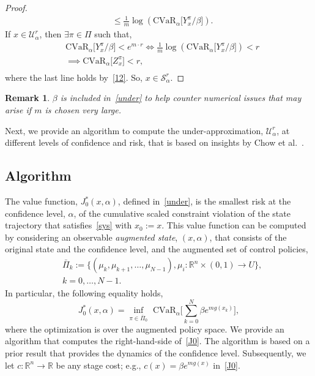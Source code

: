 \documentclass[letterpaper, 10 pt, conference]{ieeeconf}  %
\newtheorem{remark}{Remark}
\begin{document}
\begin{proof}
\begin{equation}
\begin{aligned}
& \leq \frac{1}{m} \log \left(\text{CVaR}_\alpha\big[ Y_x^\pi/\beta \big] \right).
\end{aligned}\label{12}\end{equation}
If $x \in \mathcal{U}_\alpha^r$, then $\exists \pi \in \Pi$ such that,\footnotemark
\begin{equation*}\begin{aligned}
& \text{CVaR}_\alpha \big[ Y_x^\pi /\beta \big] < e^{m\cdot r} \iff \frac{1}{m}\log \left( \text{CVaR}_\alpha \big[  Y_x^\pi /\beta \big] \right) < r \\
& \implies \text{CVaR}_\alpha\big[ Z_x^\pi \big] < r, \\
\end{aligned}\end{equation*}
where the last line holds by~\eqref{12}. So, $x \in \mathcal{S}_\alpha^r$.
\end{proof}
\begin{remark}
$\beta$ is included in~\eqref{under} to help counter numerical issues that may arise if $m$ is chosen very large.
\end{remark}

Next, we provide an algorithm to compute the under-approximation, $\mathcal{U}_\alpha^r$,
at different levels of confidence and risk, that is based on insights by Chow et al.~\cite{chow2015risk}.
\subsection{Algorithm}
The value function, $J_0^*(x,\alpha)$, defined in~\eqref{under},
is the smallest risk at the confidence level, $\alpha$, of the cumulative scaled constraint violation of the state trajectory that satisfies~\eqref{sys} with $x_0 := x$.
This value function can be computed by considering 
an observable \textit{augmented state}, $(x,\alpha)$, that consists of the original state and the confidence level,
and the augmented set of control policies,
\begin{equation}\begin{aligned}
& \bar{\Pi}_k := \{ (\mu_k, \mu_{k+1}, \dots, \mu_{N-1}), \mu_i: \mathbb{R}^n \times (0,1) \rightarrow U \},\\
& k = 0, \dots, N-1.
\end{aligned}\label{augpi}\end{equation}
In particular, the following equality holds,
\begin{equation}
J_0^*(x,\alpha) = {\underset{\pi \in \bar{\Pi}_0}\inf} \text{ CVaR}_\alpha \Big[ \textstyle\sum_{k=0}^N \beta e^{m g(x_k)} \Big],
\label{J0}
\end{equation}
where the optimization is over the augmented policy space.
We provide an algorithm that computes the right-hand-side of~\eqref{J0}.
The algorithm is based on a prior result that provides the dynamics of the confidence level.
Subsequently, we let $c: \mathbb{R}^n \rightarrow \mathbb{R}$ be any stage cost; e.g., $c(x) = \beta e^{m g(x)}$ in~\eqref{J0}.  
\end{document}

